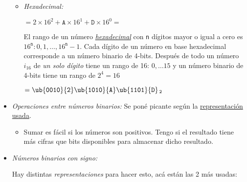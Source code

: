 \begin{itemize}[label=\iconTeoriaUno]
\begin{itemize}[label=\iconTeoriaDos]
          \item \textit{Hexadecimal:}
                \begin{center}
                   $= 2 \times 16^2 + \texttt{A} \times 16^1 + \texttt{D} \times 16^0 =$ 
                \end{center}
                El rango de un número \underline{\textit{hexadecimal}} con \texttt{n} dígitos mayor o igual a cero es $16^{\texttt{n}}: 0,1, \dots, 16^{\texttt{n}} - 1$.
                Cada dígito de un número en base hexadecimal corresponde a un número binario
                de 4-bits. Después de todo un número $i_{16}$ de \textit{un solo dígito} tiene un
                rango de 16: $0,\dots 15$ y
                un número binario de 4-bits tiene un rango de $2^4 = 16$ \checkmark

                \begin{center}
                   $= \ub{\texttt{0010}}{\texttt{2}} \ub{\texttt{1010}}{\texttt{A}}\ub{\texttt{1101}}{\texttt{D}}\,_{\texttt{2}}$
                \end{center}

        \end{itemize}

  \item \textit{Operaciones entre números binarios:} Se poné picante según la \underline{representación usada}.
        \begin{itemize}[label=\iconTeoriaDos]
          \item Sumar es fácil si los números son positivos. Tengo \textit{} si el resultado
                tiene más cifras que bits disponibles para almacenar dicho resultado.
        \end{itemize}

  \item \textit{Números binarios con signo: }\par
        Hay distintas \textit{representaciones} para hacer esto, acá están las 2 más usadas:
        \begin{itemize}[label=\iconTeoriaDos]


\end{itemize}
\end{itemize}
